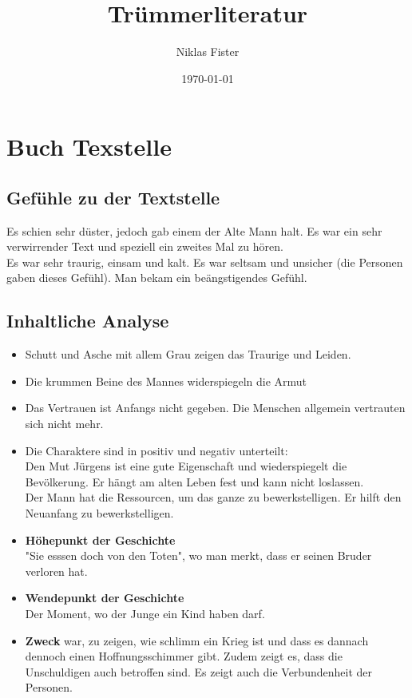 \documentclass{article}
\title{\huge\textbf{Trümmerliteratur}}
\author{Niklas Fister}
\date{\today}
\begin{document}
\maketitle
\newpage

\section{Buch Texstelle}
\subsection{Gefühle zu der Textstelle}
Es schien sehr düster, jedoch gab einem der Alte Mann halt. Es war ein sehr verwirrender Text und speziell ein zweites Mal zu hören. \\
Es war sehr traurig, einsam und kalt. Es war seltsam und unsicher (die Personen gaben dieses Gefühl). Man bekam ein beängstigendes Gefühl.

\subsection{Inhaltliche Analyse}
\begin{itemize} [parsep=0pt]
    \item Schutt und Asche mit allem Grau zeigen das Traurige und Leiden.
    \item Die krummen Beine des Mannes widerspiegeln die Armut
    \item Das Vertrauen ist Anfangs nicht gegeben. Die Menschen allgemein vertrauten sich nicht mehr.
    \item Die Charaktere sind in positiv und negativ unterteilt:\\
    Den Mut Jürgens ist eine gute Eigenschaft und wiederspiegelt die Bevölkerung. Er hängt am alten Leben fest und kann nicht loslassen. \\
    Der Mann hat die Ressourcen, um das ganze zu bewerkstelligen. Er hilft den Neuanfang zu bewerkstelligen.
    \item \textbf{Höhepunkt der Geschichte} \\
    "Sie esssen doch von den Toten", wo man merkt, dass er seinen Bruder verloren hat.
    \item \textbf{Wendepunkt der Geschichte} \\
    Der Moment, wo der Junge ein Kind haben darf.
    \item \textbf{Zweck} war, zu zeigen, wie schlimm ein Krieg ist und dass es dannach dennoch einen Hoffnungsschimmer gibt. Zudem zeigt es, dass die Unschuldigen auch betroffen sind. Es zeigt auch die Verbundenheit der Personen.
\end{itemize}
\end{document}

